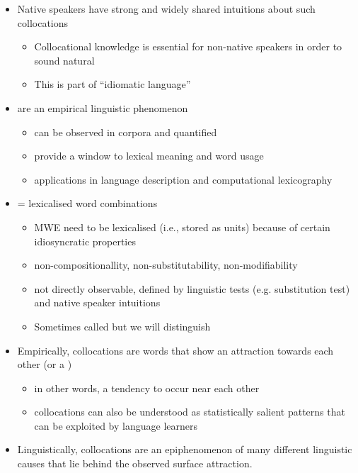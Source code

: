 \documentclass[a4paper,landscape,headrule,footrule,xetex]{foils}
\begin{document}

\begin{itemize}
\item Native speakers have strong and widely shared intuitions
about such collocations
\begin{itemize}
\item Collocational knowledge is essential for non-native
speakers in order to sound natural
\item This is part of ``idiomatic language''
\end{itemize}
\end{itemize}


\begin{itemize}
\item {} are an empirical linguistic phenomenon
\begin{itemize}
\item can be observed in corpora and quantified
\item provide a window to lexical meaning and word usage
\item applications in language description \citep{Firth:1957} and
computational lexicography \citep{Sinclair:1991}
\end{itemize}
\item {} = lexicalised word combinations
\begin{itemize}
\item MWE need to be lexicalised (i.e., stored as units) because
of certain idiosyncratic properties
\item non-compositionallity, non-substitutability, non-modifiability
  \citep{Manning:Schuetze:1999}
\item not directly observable, defined by linguistic tests
(e.g. substitution test) and native speaker intuitions
\item Sometimes called  but we will distinguish
\end{itemize}
\end{itemize}


\begin{itemize}
\item   Empirically, collocations are words that show an attraction towards
  each other (or a ) 
\begin{itemize}
\item in other words, a tendency to
  occur near each other
\item  collocations can also be understood as
  statistically salient patterns that can be exploited by language
  learners
\end{itemize}
\item Linguistically, collocations are an epiphenomenon of many
  different linguistic causes that lie behind the observed surface
  attraction.   

\end{itemize}
\end{document}
